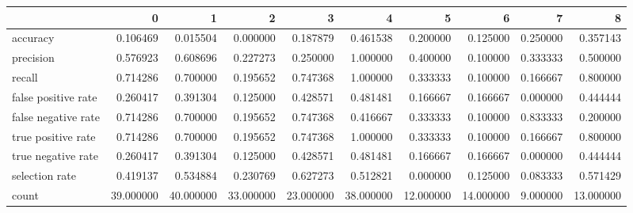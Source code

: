 \begin{tabular}{lrrrrrrrrr}
\toprule
{} &          0 &          1 &          2 &          3 &          4 &          5 &          6 &         7 &          8 \\
\midrule
accuracy            &   0.106469 &   0.015504 &   0.000000 &   0.187879 &   0.461538 &   0.200000 &   0.125000 &  0.250000 &   0.357143 \\
precision           &   0.576923 &   0.608696 &   0.227273 &   0.250000 &   1.000000 &   0.400000 &   0.100000 &  0.333333 &   0.500000 \\
recall              &   0.714286 &   0.700000 &   0.195652 &   0.747368 &   1.000000 &   0.333333 &   0.100000 &  0.166667 &   0.800000 \\
false positive rate &   0.260417 &   0.391304 &   0.125000 &   0.428571 &   0.481481 &   0.166667 &   0.166667 &  0.000000 &   0.444444 \\
false negative rate &   0.714286 &   0.700000 &   0.195652 &   0.747368 &   0.416667 &   0.333333 &   0.100000 &  0.833333 &   0.200000 \\
true positive rate  &   0.714286 &   0.700000 &   0.195652 &   0.747368 &   1.000000 &   0.333333 &   0.100000 &  0.166667 &   0.800000 \\
true negative rate  &   0.260417 &   0.391304 &   0.125000 &   0.428571 &   0.481481 &   0.166667 &   0.166667 &  0.000000 &   0.444444 \\
selection rate      &   0.419137 &   0.534884 &   0.230769 &   0.627273 &   0.512821 &   0.000000 &   0.125000 &  0.083333 &   0.571429 \\
count               &  39.000000 &  40.000000 &  33.000000 &  23.000000 &  38.000000 &  12.000000 &  14.000000 &  9.000000 &  13.000000 \\
\bottomrule
\end{tabular}

